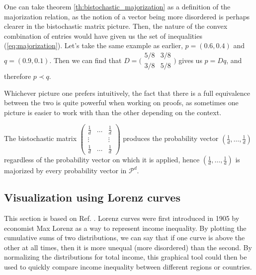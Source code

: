 One can take theorem \ref{th:bistochastic_majorization} as a definition of the majorization relation, as the notion of a vector being more disordered is perhaps clearer in the bistochastic matrix picture. Then, the nature of the convex combination %
of entries would have given us the set of inequalities (\ref{eq:majorization}). Let's take the same example as earlier, $p = (0.6, 0.4)$ and $q = (0.9, 0.1)$. Then we can find that $D = \Big(\begin{smallmatrix}
                                                                                                    5/8 & 3/8 \\
                                                                                                    3/8 & 5/8
                                                                                                \end{smallmatrix}\Big)$
gives us $p = Dq$, and therefore $p \prec q$.

Whichever picture one prefers intuitively, the fact that there is a full equivalence between the two is quite powerful when working on proofs, as sometimes one picture is easier to work with than the other depending on the context.

\begin{remark}
    The bistochastic matrix $\begin{pmatrix} \frac{1}{d} & \dots & \frac{1}{d} \\
                                                      \vdots & & \vdots \\
                                                      \frac{1}{d} & \dots & \frac{1}{d}
                             \end{pmatrix}$ 
    produces the probability vector $(\frac{1}{d}, \dots, \frac{1}{d})$ regardless of the probability vector on which it is applied, hence $(\frac{1}{d}, \dots, \frac{1}{d})$ is majorized by every probability vector in $\mathcal{P}^d$.
\end{remark}



\subsection{Visualization using Lorenz curves}

This section is based on Ref. \cite[pp. 5-6]{marshall_inequalities_2011}. Lorenz curves were first introduced in 1905 by economist Max Lorenz as a way to represent income inequality. By plotting the cumulative sums of two distributions, we can say that if one curve is above the other at all times, then it is more unequal (more disordered) than the second. By normalizing the distributions for total income, this graphical tool could then be used to quickly compare income inequality between different regions or countries.

